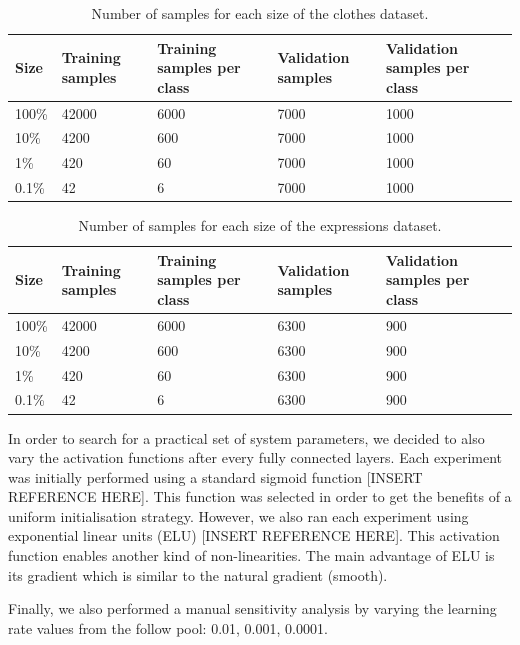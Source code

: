 \documentclass{article}
\begin{document}
\begin{table}[!htb]
  \centering
  \begin{tabular}{| l | l | l | l | l |}
    \hline
    \textbf{Size} & \textbf{Training samples} & \textbf{Training samples per class} & \textbf{Validation samples} & \textbf{Validation samples per class} \\ \hline
    100\% & 42000 & 6000 & 7000 & 1000 \\ \hline
    10\% & 4200 & 600 & 7000 & 1000 \\ \hline
    1\% & 420  & 60 & 7000 & 1000 \\ \hline
    0.1\% & 42 & 6 & 7000 & 1000 \\ \hline
  \end{tabular}
  \caption{Number of samples for each size of the clothes dataset.}
  \label{tab:ds_1}
\end{table}  
  
\begin{table}[!htb]
  \centering
  \begin{tabular}{| l | l | l | l | l |}
    \hline
    \textbf{Size} & \textbf{Training samples} & \textbf{Training samples per class} & \textbf{Validation samples} & \textbf{Validation samples per class} \\ \hline
    100\% & 42000 & 6000 & 6300 & 900 \\ \hline
    10\% & 4200 & 600 & 6300 & 900 \\ \hline
    1\% & 420  & 60 & 6300 & 900 \\ \hline
    0.1\% & 42 & 6 & 6300 & 900 \\ \hline
  \end{tabular}
  \caption{Number of samples for each size of the expressions dataset.}
  \label{tab:ds_2}
\end{table}  

In order to search for a practical set of system parameters, we decided to also vary the activation functions after every fully connected layers. Each experiment was initially performed using a standard sigmoid function [INSERT REFERENCE HERE]. This function was selected in order to get the benefits of a uniform initialisation strategy. However, we also ran each experiment using exponential linear units (ELU) [INSERT REFERENCE HERE]. This activation function enables another kind of non-linearities. The main advantage of ELU is its gradient which is similar to the natural gradient (smooth).

Finally, we also performed a manual sensitivity analysis by varying the learning rate values from the follow pool: 0.01, 0.001, 0.0001.
\end{document}
